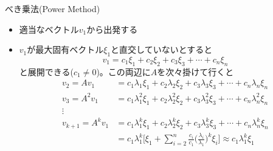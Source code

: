 \begin{frame}[t,fragile]{べき乗法(Power Method)}
  \begin{itemize}
  \item 適当なベクトル$v_1$から出発する
  \item $v_1$が最大固有ベクトル$\xi_1$と直交していないとすると
    \[
    v_1 = c_1 \xi_1 + c_2 \xi_2 + c_3 \xi_3 + \cdots + c_n \xi_n
    \]
    と展開できる($c_1 \ne 0$)。この両辺に$A$を次々掛けて行くと
    \begin{align*}
      v_2 = A v_1 &= c_1 \lambda_1 \xi_1 + c_2 \lambda_2 \xi_2 + c_3 \lambda_3 \xi_3 + \cdots + c_n \lambda_n \xi_n \\
      v_3 = A^2 v_1 &= c_1 \lambda_1^2 \xi_1 + c_2 \lambda_2^2 \xi_2 + c_3 \lambda_3^2 \xi_3 + \cdots + c_n \lambda_n^2 \xi_n \\
      \vdots \\
      v_{k+1} = A^k v_1 &= c_1 \lambda_1^k \xi_1 + c_2 \lambda_2^k \xi_2 + c_3 \lambda_3^k \xi_3 + \cdots + c_n \lambda_n^k \xi_n \\
      &= c_1 \lambda_1^k \Big[ \xi_1 + \sum_{i=2}^n \frac{c_i}{c_1} \big( \frac{\lambda_i}{\lambda_1}\big)^k \xi_i \Big] \approx c_1 \lambda_1^k \xi_1 \\
    \end{align*}
  \end{itemize}
\end{frame}

